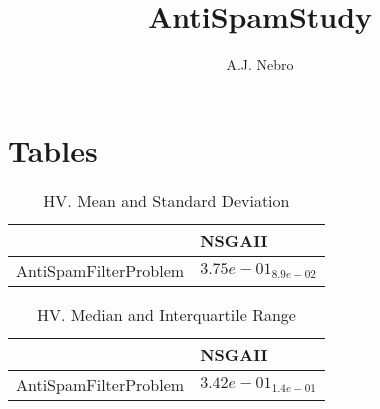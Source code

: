 \documentclass{article}
\title{AntiSpamStudy}
\author{A.J. Nebro}
\begin{document}
\maketitle
\section{Tables}

\begin{table}
\caption{HV. Mean and Standard Deviation}
\label{table: HV}
\centering
\begin{scriptsize}
\begin{tabular}{ll}
\hline &  NSGAII\\
\hline 
AntiSpamFilterProblem & \cellcolor{gray95}$  3.75e-01_{ 8.9e-02}$ \\
\hline
\end{tabular}
\end{scriptsize}
\end{table}

\begin{table}
\caption{HV. Median and Interquartile Range}
\label{table: HV}
\centering
\begin{scriptsize}
\begin{tabular}{ll}
\hline &  NSGAII\\
\hline 
AntiSpamFilterProblem & \cellcolor{gray95}$  3.42e-01_{ 1.4e-01}$ \\
\hline
\end{tabular}
\end{scriptsize}
\end{table}
\end{document}
